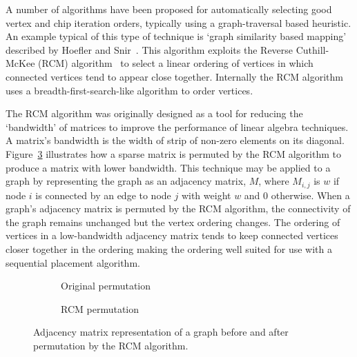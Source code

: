 				A number of algorithms have been proposed for automatically selecting
				good vertex and chip iteration orders, typically using a
				graph-traversal based heuristic. An example typical of this type of
				technique is `graph similarity based mapping' described by Hoefler and
				Snir~\cite{hoefler11}. This algorithm exploits the Reverse
				Cuthill-McKee (RCM) algorithm~\cite{cuthill69} to select a linear
				ordering of vertices in which connected vertices tend to appear close
				together. Internally the RCM algorithm uses a breadth-first-search-like
				algorithm to order vertices.
				
				The RCM algorithm was originally designed as a tool for reducing the
				`bandwidth' of matrices to improve the performance of linear algebra
				techniques. A matrix's bandwidth is the width of strip of non-zero
				elements on its diagonal. Figure~\ref{fig:rcm} illustrates how a sparse
				matrix is permuted by the RCM algorithm to produce a matrix with lower
				bandwidth. This technique may be applied to a graph by representing the
				graph as an adjacency matrix, $M$, where $M_{i,j}$ is $w$ if node $i$
				is connected by an edge to node $j$ with weight $w$ and 0 otherwise.
				When a graph's adjacency matrix is permuted by the RCM algorithm, the
				connectivity of the graph remains unchanged but the vertex ordering
				changes. The ordering of vertices in a low-bandwidth adjacency matrix
				tends to keep connected vertices closer together in the ordering making
				the ordering well suited for use with a sequential placement algorithm.
				
				\begin{figure}
					\center
					\begin{subfigure}{0.45\linewidth}
						\center
						
						\caption{Original permutation}
						\label{fig:rcm-initial}
					\end{subfigure}
					\begin{subfigure}{0.45\linewidth}
						\center
						
						\caption{RCM permutation}
						\label{fig:rcm-sorted}
					\end{subfigure}
					
					\caption[Graph adjacency matrix before and after RCM permutation.]%
					{Adjacency matrix representation of a graph before and after
					permutation by the RCM algorithm.}
					\label{fig:rcm}
				\end{figure}
				
